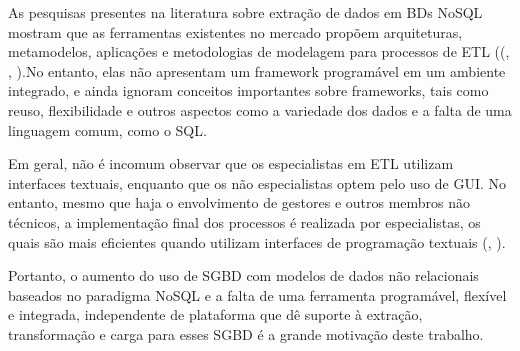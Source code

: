 

As pesquisas presentes na literatura sobre extração de dados em BDs NoSQL mostram que as ferramentas existentes no mercado propõem arquiteturas, metamodelos, aplicações e metodologias de modelagem para processos de ETL  ((\cite{silva:2016}, \cite{chevalier:2015}, \cite{liu:2013}).No entanto, elas não apresentam um framework programável em um ambiente integrado, e ainda ignoram conceitos importantes sobre frameworks, tais como reuso, flexibilidade e outros aspectos como a variedade dos dados e a falta de uma linguagem comum, como o SQL.

Em geral, não é incomum observar que os especialistas em ETL utilizam interfaces textuais, enquanto que os não especialistas optem pelo uso de GUI. No entanto, mesmo que haja o envolvimento de gestores e outros membros não técnicos, a implementação final dos processos é realizada por especialistas, os quais são mais eficientes quando utilizam interfaces de programação textuais (\cite{silva:2012}, \cite{mazanec:2012}).



Portanto, o aumento do uso de SGBD com modelos de dados não relacionais baseados no paradigma NoSQL e a falta de uma ferramenta programável, flexível e integrada, independente de plataforma que dê suporte à extração, transformação e carga para esses SGBD é a grande motivação deste trabalho.

